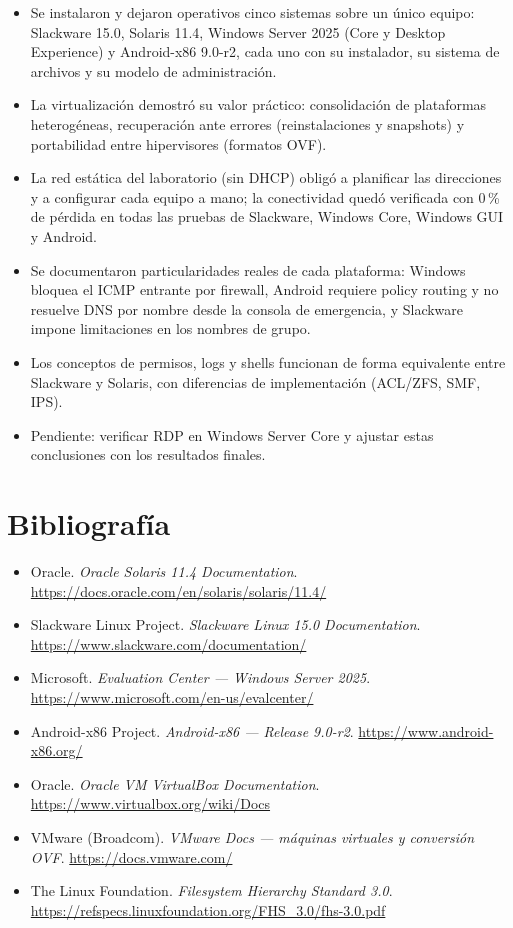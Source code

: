 \documentclass[11pt,a4paper]{report}
\begin{document}
\begin{itemize}
  \item Se instalaron y dejaron operativos cinco sistemas sobre un único equipo: Slackware 15.0, Solaris 11.4, Windows Server 2025 (Core y Desktop Experience) y Android-x86 9.0-r2, cada uno con su instalador, su sistema de archivos y su modelo de administración.
  \item La virtualización demostró su valor práctico: consolidación de plataformas heterogéneas, recuperación ante errores (reinstalaciones y snapshots) y portabilidad entre hipervisores (formatos OVF).
  \item La red estática del laboratorio (sin DHCP) obligó a planificar las direcciones y a configurar cada equipo a mano; la conectividad quedó verificada con 0\,\% de pérdida en todas las pruebas de Slackware, Windows Core, Windows GUI y Android.
  \item Se documentaron particularidades reales de cada plataforma: Windows bloquea el ICMP entrante por firewall, Android requiere policy routing y no resuelve DNS por nombre desde la consola de emergencia, y Slackware impone limitaciones en los nombres de grupo.
  \item Los conceptos de permisos, logs y shells funcionan de forma equivalente entre Slackware y Solaris, con diferencias de implementación (ACL/ZFS, SMF, IPS).
  \item Pendiente: verificar RDP en Windows Server Core y ajustar estas conclusiones con los resultados finales.
\end{itemize}

\section{Bibliografía}

\begin{itemize}
  \item Oracle. \emph{Oracle Solaris 11.4 Documentation}. \url{https://docs.oracle.com/en/solaris/solaris/11.4/}
  \item Slackware Linux Project. \emph{Slackware Linux 15.0 Documentation}. \url{https://www.slackware.com/documentation/}
  \item Microsoft. \emph{Evaluation Center --- Windows Server 2025}. \url{https://www.microsoft.com/en-us/evalcenter/}
  \item Android-x86 Project. \emph{Android-x86 --- Release 9.0-r2}. \url{https://www.android-x86.org/}
  \item Oracle. \emph{Oracle VM VirtualBox Documentation}. \url{https://www.virtualbox.org/wiki/Docs}
  \item VMware (Broadcom). \emph{VMware Docs --- máquinas virtuales y conversión OVF}. \url{https://docs.vmware.com/}
  \item The Linux Foundation. \emph{Filesystem Hierarchy Standard 3.0}. \url{https://refspecs.linuxfoundation.org/FHS_3.0/fhs-3.0.pdf}
\end{itemize}
\end{document}
